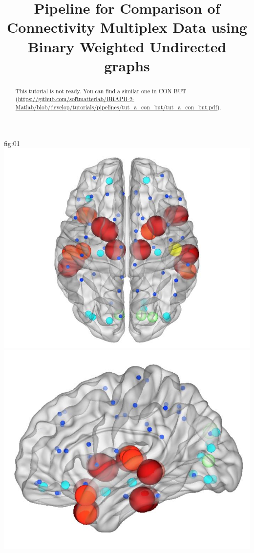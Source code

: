 \documentclass[justified]{tufte-handout}
\title{Pipeline for Comparison of Connectivity Multiplex Data using Binary Weighted Undirected graphs}
\begin{document}
\maketitle

\begin{abstract}
\noindent
This tutorial is not ready. You can find a similar one in CON BUT (\url{https://github.com/softmatterlab/BRAPH-2-Matlab/blob/develop/tutorials/pipelines/tut_a_con_but/tut_a_con_but.pdf}).
\end{abstract}
	{fig:01}
	{
	\includegraphics{fig01_01.jpg}
	\includegraphics{fig01_02.jpg}
}
\end{document}
